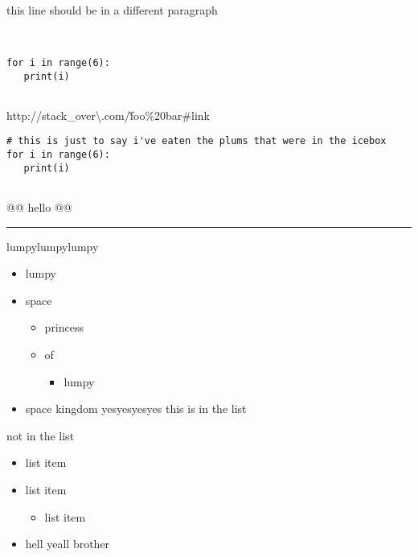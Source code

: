this line should be in a different paragraph




\begin{verbatim}


for i in range(6):
   print(i)


\end{verbatim}




http://stack\_over\backslash\backslashflo\backslashw.com/\~foo\%20bar\#link




\begin{listing}
   \begin{verbatim}
# this is just to say i've eaten the plums that were in the icebox
for i in range(6):
   print(i)


   \end{verbatim}
\end{listing}


@@ hello @@ 


\par\noindent\rule{\linewidth}{0.4pt}


lumpylumpylumpy



\begin{itemize}
\item lumpy
\item space
\begin{itemize} 
 \item princess
\item of
\begin{itemize} 
 \item lumpy
\end{itemize}
\end{itemize}
\item space kingdom yesyesyesyes this is in the list 

\end{itemize}

not in the list



\begin{itemize}
\item list item
\item list item
\begin{itemize} 
 \item list item
\end{itemize}
\item hell yeall brother 

\end{itemize}


